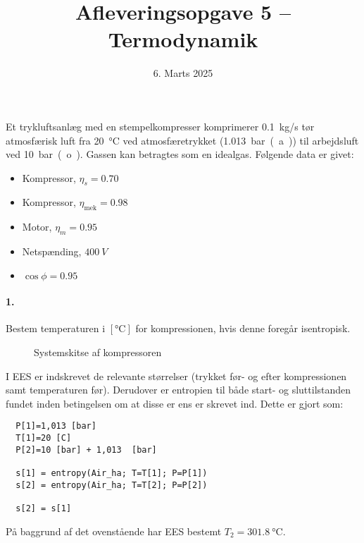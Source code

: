 \documentclass[a4paper]{article}
\title{Afleveringsopgave 5 – Termodynamik}
\date{6. Marts 2025}
\begin{document}
\maketitle

Et trykluftsanlæg med en stempelkompresser komprimerer \qty{0,1}{kg/s} tør atmosfærisk luft fra \qty{20}{\celsius} ved atmosfæretrykket (\qty{1,013}{bar(a)}) til arbejdsluft ved \qty{10}{bar(o)}. Gassen kan betragtes som en idealgas. Følgende data er givet:
\begin{itemize}
  \item Kompressor, $\eta_s = \num{0,70}$
  \item Kompressor, $\eta_{\mathrm{mek}} = \num{0,98}$
  \item Motor, $\eta_m = \num{0,95}$
  \item Netspænding, $\qty{400}{V}$
  \item $\cos\phi = \num{0,95}$
\end{itemize}

\paragraph{1.} Bestem temperaturen i $[\unit{\celsius}]$ for kompressionen, hvis denne foregår isentropisk.
\begin{figure}[ht]
    \centering
    \caption{Systemskitse af kompressoren}
    \label{fig:a5_1}
\end{figure}
\bigbreak
I EES er indskrevet de relevante størrelser (trykket før- og efter kompressionen samt temperaturen før). Derudover er entropien til både start- og sluttilstanden fundet inden betingelsen om at disse er ens er skrevet ind. Dette er gjort som:
\begin{verbatim}
  P[1]=1,013 [bar]
  T[1]=20 [C]
  P[2]=10 [bar] + 1,013  [bar] 
  
  s[1] = entropy(Air_ha; T=T[1]; P=P[1])
  s[2] = entropy(Air_ha; T=T[2]; P=P[2])
 
  s[2] = s[1]
\end{verbatim}
På baggrund af det ovenstående har EES bestemt $T_2 = \qty{301,8}{\celsius}$.
\end{document}
